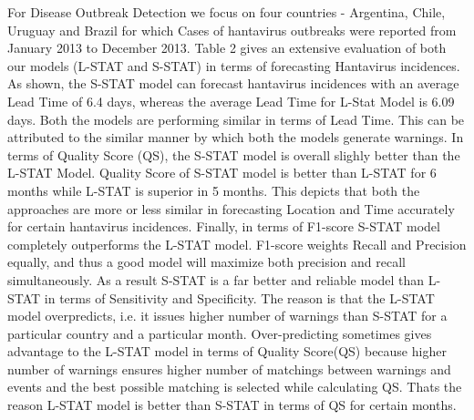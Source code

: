 \documentclass[conference]{IEEEtran}
\begin{document}
For Disease Outbreak Detection we focus on four countries - Argentina,
Chile, Uruguay and Brazil for which Cases of hantavirus outbreaks were reported
from January 2013 to December 2013. Table 2 gives an
extensive evaluation of both our models (L-STAT and S-STAT) in terms of
forecasting Hantavirus incidences. As shown, the S-STAT model can
forecast hantavirus incidences with an average Lead Time of 6.4 days,
whereas the average Lead Time for L-Stat Model is 6.09 days. Both the
models are performing similar in terms of Lead Time. This can be
attributed to the similar manner by which both the models generate
warnings. In terms of Quality Score (QS), the S-STAT model is overall slighly
better than the L-STAT Model. Quality Score of S-STAT model is better than L-STAT for 6
months while L-STAT is superior in 5 months. This depicts that both the
approaches are more or less similar in forecasting Location and Time
accurately for certain hantavirus incidences. Finally, in terms of
F1-score S-STAT model completely outperforms the L-STAT model. F1-score
weights Recall and Precision equally, and thus a good model will
maximize both precision and recall simultaneously. As a result S-STAT is
a far better and reliable model than L-STAT in terms of Sensitivity and
Specificity. The reason is that the L-STAT model overpredicts, i.e. it
issues higher number of warnings than S-STAT for a particular country and  
a particular month. Over-predicting sometimes gives
advantage to the L-STAT model in terms of Quality Score(QS) because
higher number of warnings ensures higher number of matchings between
warnings and events and the best possible matching is selected while
calculating QS. Thats the reason L-STAT model is better than S-STAT in
terms of QS for certain months.
\end{document}
